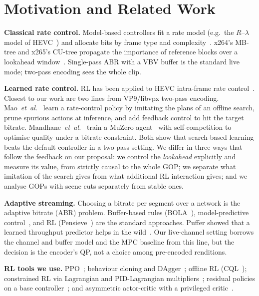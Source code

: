 \documentclass[conference]{IEEEtran}
\begin{document}
\section{Motivation and Related Work}
\textbf{Classical rate control.} Model-based controllers fit a rate model (e.g.\ the $R$--$\lambda$ model of HEVC~\cite{li2014lambda}) and allocate bits by frame type and complexity~\cite{chen2007rcsurvey}. x264's MB-tree and x265's CU-tree propagate the importance of reference blocks over a lookahead window~\cite{garrett2009mbtree}. Single-pass ABR with a VBV buffer is the standard live mode; two-pass encoding sees the whole clip.

\textbf{Learned rate control.} RL has been applied to HEVC intra-frame rate control~\cite{hu2018rlintra}. Closest to our work are two lines from VP9/libvpx two-pass encoding. Mao~\emph{et~al.}~\cite{mao2020neural} learn a rate-control policy by imitating the plans of an offline search, prune spurious actions at inference, and add feedback control to hit the target bitrate. Mandhane~\emph{et~al.}~\cite{mandhane2022muzero} train a MuZero agent~\cite{schrittwieser2020muzero} with self-competition to optimise quality under a bitrate constraint. Both show that search-based learning beats the default controller in a two-pass setting. We differ in three ways that follow the feedback on our proposal: we control the \emph{lookahead} explicitly and measure its value, from strictly causal to the whole GOP; we separate what imitation of the search gives from what additional RL interaction gives; and we analyse GOPs with scene cuts separately from stable ones.

\textbf{Adaptive streaming.} Choosing a bitrate per segment over a network is the adaptive bitrate (ABR) problem. Buffer-based rules (BOLA~\cite{spiteri2016bola}), model-predictive control~\cite{yin2015mpc}, and RL (Pensieve~\cite{mao2017pensieve}) are the standard approaches. Puffer showed that a learned throughput predictor helps in the wild~\cite{yan2020puffer}. Our live-channel setting borrows the channel and buffer model and the MPC baseline from this line, but the decision is the encoder's QP, not a choice among pre-encoded renditions.

\textbf{RL tools we use.} PPO~\cite{schulman2017ppo}; behaviour cloning and DAgger~\cite{pomerleau1989alvinn,ross2011dagger}; offline RL (CQL~\cite{kumar2020cql}); constrained RL via Lagrangian and PID-Lagrangian multipliers~\cite{altman1999cmdp,tessler2019rcpo,stooke2020pid}; residual policies on a base controller~\cite{silver2018residual,johannink2019residual}; and asymmetric actor-critic with a privileged critic~\cite{pinto2018asymmetric}.
\end{document}
